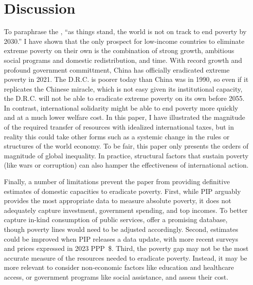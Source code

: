 \section{Discussion} 

To paraphrase the \cite{un_sustainable_2022}, ``as things stand, the world is not on track to end poverty by 2030.'' I have shown that the only prospect for low-income countries to eliminate extreme poverty on their own is the combination of strong growth, ambitious social programs and domestic redistribution, and time. 
With record growth and profound government committment, China has officially eradicated extreme poverty in 2021. The D.R.C. is poorer today than China was in 1990, %
so even if it replicates the Chinese miracle, which is not easy given its institutional capacity, the D.R.C. will not be able to eradicate extreme poverty on its own before 2055. %
In contrast, international solidarity might be able to end poverty more quickly and at a much lower welfare cost. In this paper, I have illustrated the magnitude of the required transfer of resources with idealized international taxes, but in reality this could take other forms such as a systemic change in the rules or structures of the world economy. 
To be fair, this paper only presents the orders of magnitude of global inequality. %
In practice, structural factors that sustain poverty (like wars or corruption) %
can also hamper the effectiveness of international action. %

Finally, a number of limitations prevent the paper from providing definitive estimates of domestic capacities to eradicate poverty. First, while PIP arguably provides the most appropriate data to measure absolute poverty, it does not adequately capture investment, government spending, and top incomes. To better capture in-kind consumption of public services, \cite{fisher-post_government_2023} offer a promising database, though poverty lines would need to be adjusted accordingly. Second, estimates could be improved when PIP releases a data update, with more recent surveys and prices expressed in 2023 PPP~\$. Third, the poverty gap may not be the most accurate measure of the resources needed to eradicate poverty. Instead, it may be more relevant to consider non-economic factors like education and healthcare access, or government programs like social assistance, and assess their cost.


